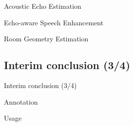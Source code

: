 \begin{frame}[standout]{Acoustic Echo Estimation}

\end{frame}

\begin{frame}{Echo-aware Speech Enhancement}

\end{frame}

\begin{frame}{Room Geometry Estimation}

\end{frame}

\subsection{Interim conclusion (3/4)}

\begin{frame}{Interim conclusion (3/4)}
    \begin{block}{Annotation}

    \end{block}

    \begin{block}{Usage}

    \end{block}
\end{frame}